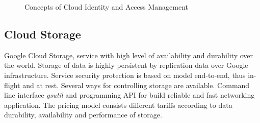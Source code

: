 \documentclass[a4paper,12pt,oneside]{report}
\begin{document}
	\begin{figure}[!htbp]
		\centering
		
		
		\caption[access]{Concepts of Cloud Identity and Access Management  
			\centering }
		\label{fig:iam}
	\end{figure}
	
	
	\subsection{Cloud Storage}
	\label{subsub:datastore}
	Google Cloud Storage, service with high level of availability and durability 
	over the world. Storage of data is highly persistent by replication data over
	Google 
	infrastructure. Service security protection is based 
	on model end-to-end, thus in-flight and at rest.  Several ways for controlling
	storage are available. Command 
	line interface \textit{gsutil} and programming API for build 
	reliable and fast networking application. The pricing model consists different
	tariffs 
	according to data durability, availability and performance of storage.
	
\end{document}
